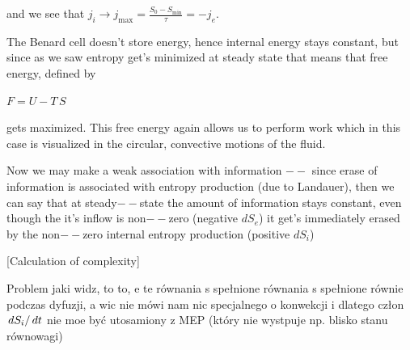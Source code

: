 \documentclass{article}
\newcommand{\unicode}[1]{{}}
\begin{document}
and we see that \(j_i\to j_{\max }=\frac{S_0-S_{\min }}{\tau }=-j_e\). 

The Benard cell doesn{'}t store energy, hence internal energy stays constant, but since as we saw entropy get{'}s minimized at steady state that
means that free energy, defined by

\(F=U-T\, S\)

gets maximized. This free energy again allows us to perform work which in this case is visualized in the circular, convective motions of the fluid.

Now we may make a weak association with information $--$ since erase of information is associated with entropy production (due to Landauer), then
we can say that at steady$--$state the amount of information stays constant, even though the it{'}s inflow is non$--$zero (negative \(dS_e\)) it
get{'}s immediately erased by the non$--$zero internal entropy production (positive \(dS_i\))

[Calculation of complexity]

Problem jaki widz$\unicode{0119}$, to to, $\unicode{017c}$e te r{\' o}wnania s$\unicode{0105}$ spe{\l}nione r{\' o}wnania s$\unicode{0105}$ spe{\l}nione
r{\' o}wnie$\unicode{017c}$ podczas dyfuzji, a wi$\unicode{0119}$c nie m{\' o}wi$\unicode{0105}$ nam nic specjalnego o konwekcji i dlatego cz{\l}on
\(\left.dS_i\right/dt\) nie mo$\unicode{017c}$e by{\' c} uto$\unicode{017c}$samiony z MEP (kt{\' o}ry nie wyst$\unicode{0119}$puje np. blisko stanu
r{\' o}wnowagi)
\end{document}
